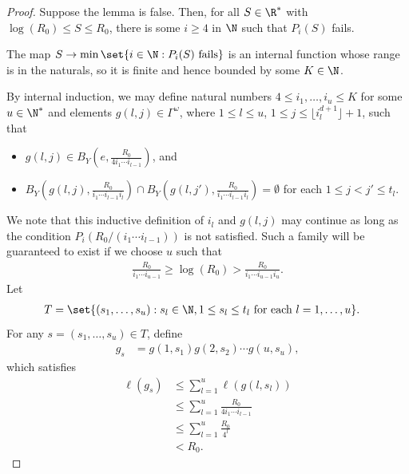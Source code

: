 \documentclass[10pt]{mypackage}
\begin{document}
\begin{proof}
  Suppose the lemma is false. Then, for all $S\in \R^{\ast}$ with $\log\left( R_0 \right)\leq S \leq R_0$, there is some $i\geq 4$ in $\N$ such that $P_i(S)$ fails.

  The map $S\to \min\set{i\in \N : P_i(S)\text{ fails}}$ is an internal function whose range is in the naturals, so it is finite and hence bounded by some $K\in \N$.

  By internal induction, we may define natural numbers $4\leq i_1,\dots,i_u\leq K$ for some $u\in \N^{\ast}$ and elements $g(l,j)\in \Gamma^{\omega}$, where $1\leq l \leq u$, $1\leq j \leq \lfloor i_l^{d+1}\rfloor + 1$, such that
  \begin{itemize}
    \item $g(l,j)\in B_Y\left( e,\frac{R_0}{4i_1\cdots i_{l-1}} \right)$, and
    \item $B_Y\left( g(l,j),\frac{R_0}{i_1\cdots i_{l-1} i_{l}} \right)\cap B_Y\left( g(l,j'), \frac{R_0}{i_1\cdots i_{l-1}i_{l}}\right) = \emptyset$ for each $1\leq j < j' \leq t_l$.
  \end{itemize}
  We note that this inductive definition of $i_l$ and $g\left( l,j \right)$ may continue as long as the condition $P_i\left( R_0/\left( i_1\cdots i_{l-1} \right) \right)$ is not satisfied. Such a family will be guaranteed to exist if we choose $u$ such that
  \begin{align*}
    \frac{R_0}{i_1\cdots i_{u-1}} \geq \log\left( R_0 \right) > \frac{R_0}{i_1\cdots i_{u-1}i_u}.
  \end{align*}
  Let
  \begin{align*}
    T &= \set{\left( s_1,\dots,s_u \right) : s_l\in \N,1\leq s_l\leq t_l\text{ for each }l=1,\dots,u}.
  \end{align*}
  For any $s = \left( s_1,\dots,s_u \right)\in T$, define
  \begin{align*}
    g_s &= g\left( 1,s_1 \right)g\left( 2,s_2 \right)\cdots g\left( u,s_u \right),
  \end{align*}
  which satisfies
  \begin{align*}
    \ell\left( g_s \right) &\leq \sum_{l=1}^{u} \ell\left( g\left( l,s_l \right) \right)\\
                           &\leq \sum_{l=1}^{u} \frac{R_0}{4i_1\cdots i_{l-1}}\\
                           &\leq \sum_{l=1}^{u} \frac{R_0}{4^{l}}\\
                           &< R_0.
  \end{align*}

\end{proof}
\end{document}
